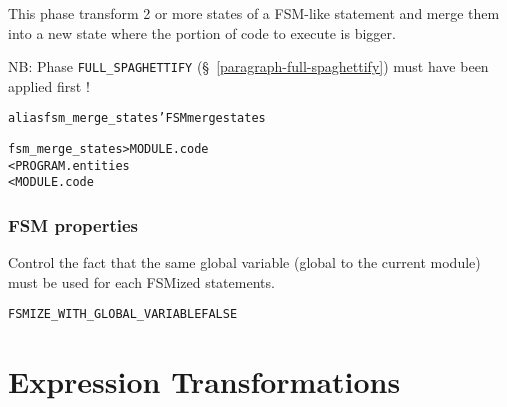 \documentclass[a4paper]{report}
\newenvironment{PipsProp}{\begin{alltt}}{\end{alltt}}
\newenvironment{PipsMake}{\begin{alltt}}{\end{alltt}}
\begin{document}
This phase transform 2 or more states of a FSM-like statement and merge
them into a new state where the portion of code to execute is bigger.

NB: Phase \texttt{FULL\_SPAGHETTIFY} (\S~\ref{paragraph-full-spaghettify})
must have been applied first !

\begin{PipsMake}
alias fsm_merge_states 'FSM merge states

fsm_merge_states    > MODULE.code
        < PROGRAM.entities
        < MODULE.code
\end{PipsMake}


\subsubsection{FSM properties}

Control the fact that the same global variable (global to the
current module) must be used for each FSMized statements.

\begin{PipsProp}
FSMIZE_WITH_GLOBAL_VARIABLE FALSE
\end{PipsProp}









\section{Expression Transformations}
\end{document}
